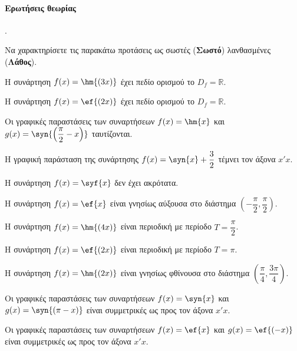 \documentclass[11pt,a4paper,twocolumn]{article}
\newcounter{askhsh}
\newcommand{\askhsh}{\large\theaskhsh.\ \addtocounter{askhsh}{1}}
\begin{document}
\paragraph{Ερωτήσεις θεωρίας}
\askhsh Να χαρακτηρίσετε τις παρακάτω προτάσεις ως σωστές (\textbf{Σωστό}) λανθασμένες (\textbf{Λάθος}).
\begin{alist}
\item Η συνάρτηση $f(x)=\hm{(3x)}$ έχει πεδίο ορισμού το $D_f=\mathbb{R}$.
\item Η συνάρτηση $f(x)=\ef{(2x)}$ έχει πεδίο ορισμού το $D_f=\mathbb{R}$.
\item Οι γραφικές παραστάσεις των συναρτήσεων $f(x)=\hm{x}$ και $g(x)=\syn{\left(\dfrac{\pi}{2}-x\right)}$ ταυτίζονται.
\item Η γραφική παράσταση της συνάρτησης $f(x)=\syn{x}+\dfrac{3}{2}$ τέμνει τον άξονα $x'x$.
\item Η συνάρτηση $f(x)=\syf{x}$ δεν έχει ακρότατα.
\item Η συνάρτηση $f(x)=\ef{x}$ είναι γνησίως αύξουσα στο διάστημα $\left(-\dfrac{\pi}{2},\dfrac{\pi}{2}\right)$.
\item Η συνάρτηση $f(x)=\hm{(4x)}$ είναι περιοδική με περίοδο $T=\dfrac{\pi}{2}$.
\item Η συνάρτηση $f(x)=\ef{(2x)}$ είναι περιοδική με περίοδο $T=\pi$.
\item Η συνάρτηση $f(x)=\hm{(2x)}$ είναι γνησίως φθίνουσα στο διάστημα $\left(\dfrac{\pi}{4},\dfrac{3\pi}{4}\right)$.
\item Οι γραφικές παραστάσεις των συναρτήσεων $f(x)=\syn{x}$ και $g(x)=\syn{(\pi-x)}$ είναι συμμετρικές ως προς τον άξονα $x'x$.
\item Οι γραφικές παραστάσεις των συναρτήσεων $f(x)=\ef{x}$ και $g(x)=\ef{(-x)}$ είναι συμμετρικές ως προς τον άξονα $x'x$.
\end{alist}
\end{document}
